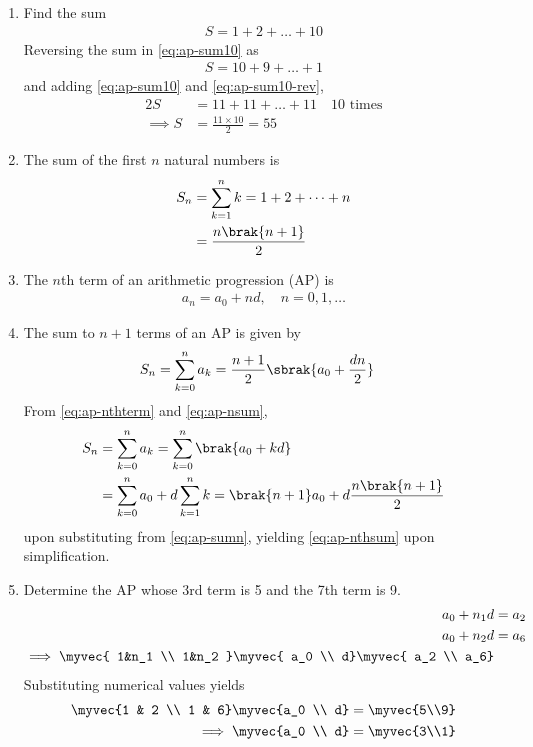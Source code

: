 \begin{enumerate}[label=\thesubsection.\arabic*,ref=\thesubsection.\theenumi]
	\item Find the sum
\begin{align}
	\label{eq:ap-sum10}
	S = 1 + 2 + \dots + 10
\end{align}
\solution Reversing the sum in
	\eqref{eq:ap-sum10}
	as
\begin{align}
	\label{eq:ap-sum10-rev}
	S = 10 + 9 + \dots + 1
\end{align}
and adding 
	\eqref{eq:ap-sum10}
	and
	\eqref{eq:ap-sum10-rev},
\begin{align}
	\label{eq:ap-sum10-add}
	2S &= 11 + 11 + \dots + 11 \quad 10 \text{ times}
	\\
	\implies S &= \frac{11 \times 10}{2} = 55
\end{align}
\item The sum of the first $n$ natural numbers is
\begin{align}
	S_n &= \sum_{k=1}^{n}k = 1+ 2 + \dots + n
	\\
	&= \frac{n\brak{n+1}}{2}
	\label{eq:ap-sumn}
\end{align}
\item The $n$th term of an arithmetic progression (AP) is
\begin{align}
	\label{eq:ap-nthterm}
	a_n = a_0 + nd, \quad n = 0, 1, \dots
\end{align}
\item The sum to $n+1$ terms of an AP is given by
\begin{align}
	\label{eq:ap-nsum}
	S_n &= \sum_{k=0}^{n}a_k = \frac{n+1}{2}\sbrak{a_0 + \frac{dn}{2}}
\end{align}
\solution
From
	\eqref{eq:ap-nthterm}
	and
	\eqref{eq:ap-nsum},
\begin{align}
	\label{eq:ap-nthsum}
	S_n &= \sum_{k=0}^{n}a_k = 
\sum_{k=0}^{n}
	 \brak{a_0 + kd} 
	 \\
	 &= 
\sum_{k=0}^{n}a_0 + 
d\sum_{k=1}^{n}k
	  = \brak{n+1}a_0 + d\frac{n\brak{n+1}}{2}
\end{align}
upon substituting from
	\eqref{eq:ap-sumn}, yielding
	\eqref{eq:ap-nthsum}
	upon simplification.
\item Determine the AP whose 3rd term is 5 and the 7th term is 9.
	\\
	\solution
\begin{align}
	a_0+n_1d &= a_2
	\\
	a_0+n_2d &= a_6
	\\
	\implies 
	\myvec{
	1&n_1 
	\\
	1&n_2 
}
	\myvec{
a_0
\\
	d}
	\myvec{
a_2
\\
	a_6}
       \end{align}
Substituting numerical values 
yields
\begin{align}
	\myvec{1 & 2 \\ 1 & 6}
	\myvec{a_0 \\ d}
	&=
	\myvec{5\\9}
	\\
	\implies \myvec{a_0 \\ d}
	&=
	\myvec{3\\1}
\end{align}
\end{enumerate}
